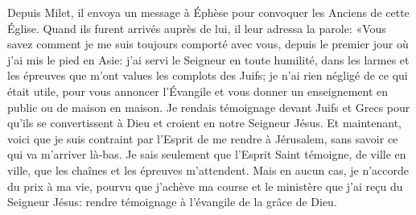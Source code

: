 Depuis Milet, il envoya un message à Éphèse
	pour convoquer les Anciens de cette Église.
Quand ils furent arrivés auprès de lui, il leur adressa la parole:
	«Vous savez comment je me suis toujours comporté avec vous,
	depuis le premier jour où j’ai mis le pied en Asie:
	j’ai servi le Seigneur en toute humilité,
	dans les larmes et les épreuves que m’ont values les complots des Juifs;
	je n’ai rien négligé de ce qui était utile, pour vous annoncer l’Évangile
	et vous donner un enseignement en public ou de maison en maison.
Je rendais témoignage devant Juifs et Grecs pour qu’ils se convertissent à Dieu
	et croient en notre Seigneur Jésus.
Et maintenant,
	voici que je suis contraint par l’Esprit de me rendre à Jérusalem,
	sans savoir ce qui va m’arriver là-bas.
Je sais seulement que l’Esprit Saint témoigne, de ville en ville,
	que les chaînes et les épreuves m’attendent.
Mais en aucun cas, je n’accorde du prix à ma vie,
	pourvu que j’achève ma course
		et le ministère que j’ai reçu du Seigneur Jésus:
	rendre témoignage à l’évangile de la grâce de Dieu.
